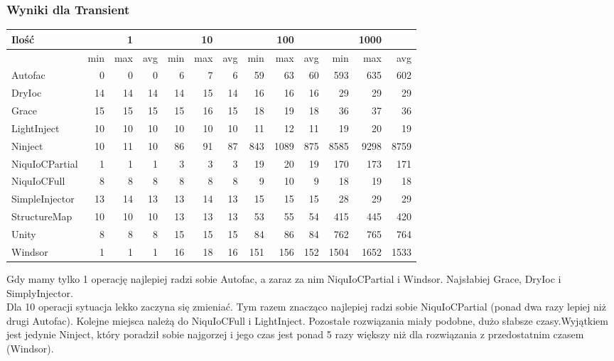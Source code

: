 \documentclass[12pt]{article}
\begin{document}
\subsubsection{Wyniki dla Transient}
\begin{center}
\begin{small}
	\begin{tabular}{ | l | r r r | r r r | r r r | r r r | }
    		\hline
     		Ilość & & 1 & & & 10 & & & 100 & & & 1000 & \\ \hline
     		 & min & max & avg & min & max & avg & min & max & avg & min & max & avg \\ \hline
    		Autofac & 0 & 0 & 0 & 6 & 7 & 6 & 59 & 63 & 60 & 593 & 635 & 602 \\ \hline
		DryIoc & 14 & 14 & 14 & 14 & 15 & 14 & 16 & 16 & 16 & 29 & 29 & 29 \\ \hline
		Grace & 15 & 15 & 15 & 15 & 16 & 15 & 18 & 19 & 18 & 36 & 37 & 36 \\ \hline
		LightInject & 10 & 10 & 10 & 10 & 10 & 10 & 11 & 12 & 11 & 19 & 20 & 19 \\ \hline
		Ninject & 10 & 11 & 10 & 86 & 91 & 87 & 843 & 1089 & 875 & 8585 & 9298 & 8759 \\ \hline
		NiquIoCPartial & 1 & 1 & 1 & 3 & 3 & 3 & 19 & 20 & 19 & 170 & 173 & 171 \\ \hline
		NiquIoCFull & 8 & 8 & 8 & 8 & 8 & 8 & 9 & 10 & 9 & 18 & 19 & 18 \\ \hline
		SimpleInjector & 13 & 14 & 13 & 13 & 14 & 13 & 15 & 15 & 15 & 28 & 29 & 29 \\ \hline
		StructureMap & 10 & 10 & 10 & 13 & 13 & 13 & 53 & 55 & 54 & 415 & 445 & 420 \\ \hline
		Unity & 8 & 8 & 8 & 15 & 15 & 15 & 84 & 86 & 84 & 762 & 765 & 764 \\ \hline
		Windsor & 1 & 1 & 1 & 16 & 18 & 16 & 151 & 156 & 152 & 1504 & 1652 & 1533 \\
    		\hline
  	\end{tabular}
\end{small}
\end{center}
Gdy mamy tylko 1 operację najlepiej radzi sobie Autofac, a zaraz za nim NiquIoCPartial i Windsor. Najsłabiej Grace, DryIoc i SimplyInjector.\\
Dla 10 operacji sytuacja lekko zaczyna się zmieniać. Tym razem znacząco najlepiej radzi sobie NiquIoCPartial (ponad dwa razy lepiej niż drugi Autofac). Kolejne miejsca należą do NiquIoCFull i LightInject. Pozostałe rozwiązania miały podobne, dużo słabsze czasy.Wyjątkiem jest jedynie Ninject, który poradził sobie najgorzej i jego czas jest ponad 5 razy większy niż dla rozwiązania z przedostatnim czasem (Windsor).\\
\end{document}
